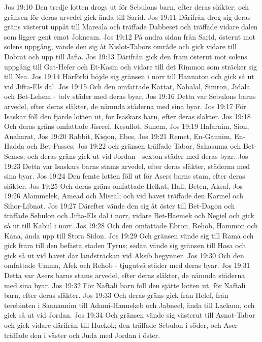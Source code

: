 Jos 19:10  Den tredje lotten drogs ut för Sebulons barn, efter deras släkter; och gränsen för deras arvedel gick ända till Sarid.
Jos 19:11  Därifrån drog sig deras gräns västerut uppåt till Mareala och träffade Dabbeset och träffade vidare dalen som ligger gent emot Jokneam.
Jos 19:12  På andra sidan från Sarid, österut mot solens uppgång, vände den sig åt Kislot-Tabors område och gick vidare till Dobrat och upp till Jafia.
Jos 19:13  Därifrån gick den fram österut mot solens uppgång till Gat-Hefer och Et-Kasin och vidare till det Rimmon som sträcker sig till Nea.
Jos 19:14  Härförbi böjde sig gränsen i norr till Hannaton och gick så ut vid Jifta-Els dal.
Jos 19:15  Och den omfattade Kattat, Nahalal, Simron, Jidala och Bet-Lehem - tolv städer med deras byar.
Jos 19:16  Detta var Sebulons barns arvedel, efter deras släkter, de nämnda städerna med sina byar.
Jos 19:17  För Isaskar föll den fjärde lotten ut, för Isaskars barn, efter deras släkter.
Jos 19:18  Och deras gräns omfattade Jisreel, Kesullot, Sunem,
Jos 19:19  Hafaraim, Sion, Anaharat,
Jos 19:20  Rabbit, Kisjon, Ebes,
Jos 19:21  Remet, En-Gannim, En-Hadda och Bet-Passes;
Jos 19:22  och gränsen träffade Tabor, Sahasuma och Bet-Semes; och deras gräns gick ut vid Jordan - sexton städer med deras byar.
Jos 19:23  Detta var Isaskars barns stams arvedel, efter deras släkter, städerna med sina byar.
Jos 19:24  Den femte lotten föll ut för Asers barns stam, efter deras släkter.
Jos 19:25  Och deras gräns omfattade Helkat, Hali, Beten, Aksaf,
Jos 19:26  Alammelek, Amead och Miseal; och vid havet träffade den Karmel och Sihor-Libnat.
Jos 19:27  Därefter vände den sig åt öster till Bet-Dagon och träffade Sebulon och Jifta-Els dal i norr, vidare Bet-Haemek och Negiel och gick så ut till Kabul i norr.
Jos 19:28  Och den omfattade Ebron, Rehob, Hammon och Kana, ända upp till Stora Sidon.
Jos 19:29  Och gränsen vände sig till Rama och gick fram till den befästa staden Tyrus; sedan vände sig gränsen till Hosa och gick så ut vid havet där landsträckan vid Aksib begynner.
Jos 19:30  Och den omfattade Umma, Afek och Rehob - tjugutvå städer med deras byar.
Jos 19:31  Detta var Asers barns stams arvedel, efter deras släkter, de nämnda städerna med sina byar.
Jos 19:32  För Naftali barn föll den sjätte lotten ut, för Naftali barn, efter deras släkter.
Jos 19:33  Och deras gräns gick från Helef, från terebinten i Saanannim till Adami-Hannekeb och Jabneel, ända till Lackum, och gick så ut vid Jordan.
Jos 19:34  Och gränsen vände sig västerut till Asnot-Tabor och gick vidare därifrån till Huckok; den träffade Sebulon i söder, och Aser träffade den i väster och Juda med Jordan i öster.
